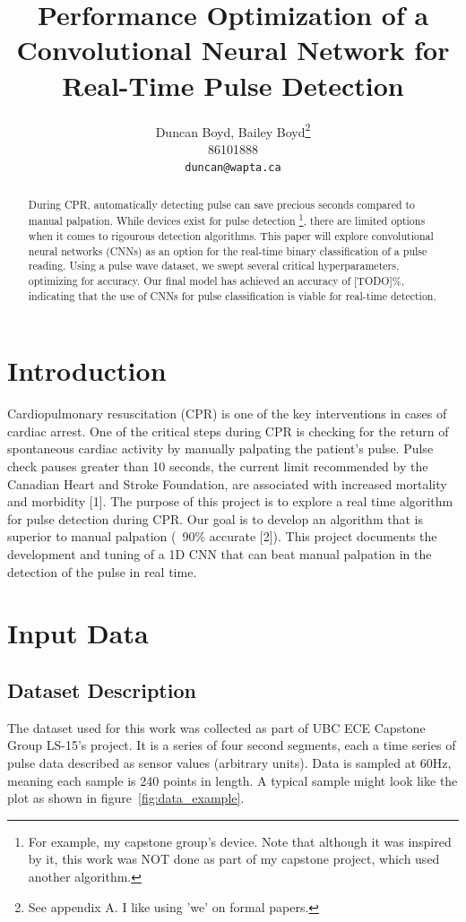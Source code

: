 \documentclass{article}
\title{Performance Optimization of a Convolutional Neural Network for Real-Time Pulse Detection}
\author{
  Duncan Boyd, Bailey Boyd\thanks{See appendix A. I like using 'we' on formal papers.} \\
  86101888 \\
  \texttt{duncan@wapta.ca} \\
}
\begin{document}
\maketitle


\begin{abstract}
  During CPR, automatically detecting pulse can save precious seconds compared to manual palpation. While devices exist for pulse detection \footnote{For example, my capstone group's device. Note that although it was inspired by it, this work was NOT done as part of my capstone project, which used another algorithm.}, there are limited options when it comes to rigourous detection algorithms. This paper will explore convolutional neural networks (CNNs) as an option for the real-time binary classification of a pulse reading. Using a pulse wave dataset, we swept several critical hyperparameters, optimizing for accuracy. Our final model has achieved an accuracy of [TODO]\%, indicating that the use of CNNs for pulse classification is viable for real-time detection.
\end{abstract}

\section{Introduction}

Cardiopulmonary resuscitation (CPR) is one of the key interventions in cases of cardiac arrest. One of the critical steps during CPR is checking for the return of spontaneous cardiac activity by manually palpating the patient's pulse. Pulse check pauses greater than 10 seconds, the current limit recommended by the Canadian Heart and Stroke Foundation, are associated with increased mortality and morbidity [1]. The purpose of this project is to explore a real time algorithm for pulse detection during CPR. Our goal is to develop an algorithm that is superior to manual palpation (~90\% accurate [2]). This project documents the development and tuning of a 1D CNN that can beat manual palpation in the detection of the pulse in real time.

\section{Input Data}

\subsection{Dataset Description}

The dataset used for this work was collected as part of UBC ECE Capstone Group LS-15's project. It is a series of four second segments, each a time series of pulse data described as sensor values (arbitrary units). Data is sampled at 60Hz, meaning each sample is 240 points in length. A typical sample might look like the plot as shown in figure~\ref{fig:data_example}.
\end{document}
